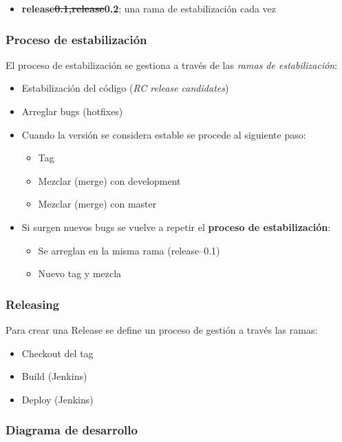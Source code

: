 \begin{itemize}
\item
  \textbf{release\sout{0.1\textbf{,}release}0.2}; una rama de
  estabilización cada vez
\end{itemize}
\subsubsection{Proceso de estabilización}

El proceso de estabilización se gestiona a través de las \emph{ramas de
estabilización}:

\begin{itemize}
\item
  Estabilización del código (\emph{RC release candidates})
\item
  Arreglar bugs (hotfixes)
\item
  Cuando la versión se considera estable se procede al siguiente paso:
  \begin{itemize}
  \item
    Tag
  \item
    Mezclar (merge) con development
  \item
    Mezclar (merge) con master
  \end{itemize}
\item
  Si surgen nuevos bugs se vuelve a repetir el \textbf{proceso de
  estabilización}:
  \begin{itemize}
  \item
    Se arreglan en la misma rama (release--0.1)
  \item
    Nuevo tag y mezcla
  \end{itemize}
\end{itemize}
\subsubsection{Releasing}

Para crear una Release se define un proceso de gestión a través las
ramas:

\begin{itemize}
\item
  Checkout del tag
\item
  Build (Jenkins)
\item
  Deploy (Jenkins)
\end{itemize}
\subsubsection{Diagrama de desarrollo}

